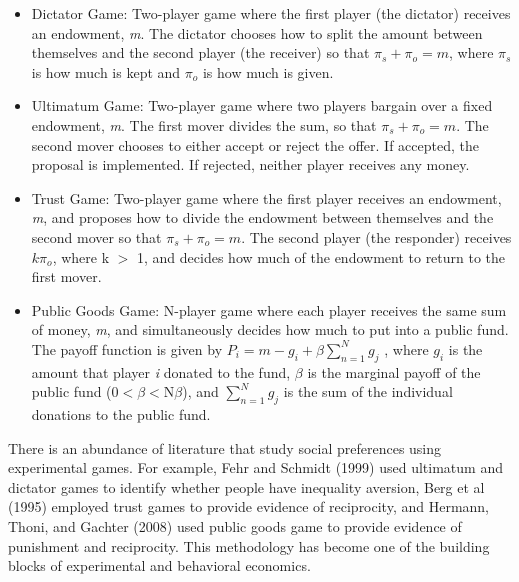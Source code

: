 \documentclass{article}
\begin{document}
\begin{itemize}

\item{Dictator Game}: Two-player game where the first player (the dictator) receives an endowment, \textit{m}. The dictator chooses how to split the amount between themselves and the second player (the receiver) so that \(\pi_{s} + \pi_{o} = \textit{m}\), where \(\pi_{s}\) is how much is kept and \(\pi_{o}\) is how much is given.
\item{Ultimatum Game}: Two-player game where two players bargain over a fixed endowment, \textit{m}. The first mover divides the sum, so that \(\pi_{s} + \pi_{o} = m\). The second mover chooses to either accept or reject the offer. If accepted, the proposal is implemented. If rejected, neither player receives any money.
\item{Trust Game}: Two-player game where the first player receives an endowment, \textit{m}, and proposes how to divide the endowment between themselves and the second mover so that \(\pi_{s} + \pi_{o} = m\). The second player (the responder) receives \(k\pi_{o}\), where k $>$ 1, and decides how much of the endowment to return to the first mover. 
\item{Public Goods Game}: N-player game where each player receives the same sum of money, \textit{m}, and simultaneously decides how much to put into a public fund. The payoff function is given by \( P_{i} = m - g_{i} + \beta \sum_{n=1}^{N} g_{j} \) , where \(g_{i}\) is the amount that player \textit{i} donated to the fund, \(\beta\) is the marginal payoff of the public fund (0$<$\(\beta\)$<$N\(\beta\)), and \(\sum_{n=1}^{N}g_{j}\) is the sum of the individual donations to the public fund. 

\end{itemize}

There is an abundance of literature that study social preferences using experimental games. For example, Fehr and Schmidt (1999) used ultimatum and dictator games to identify whether people have inequality aversion, Berg et al (1995) employed trust games to provide evidence of reciprocity, and Hermann, Thoni, and Gachter (2008) used public goods game to provide evidence of punishment and reciprocity. This methodology has become one of the building blocks of experimental and behavioral economics. 
 
\end{document}
